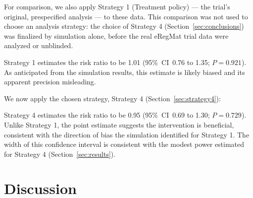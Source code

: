 \begin{minipage}{\linewidth}
\begin{stlog}
\nullskip
\end{stlog}
\end{minipage}

For comparison, we also apply Strategy 1 (Treatment policy) --- the
trial's original, prespecified analysis --- to these data. This
comparison was not used to choose an analysis strategy: the choice of
Strategy 4 (Section~\ref{sec:conclusions}) was finalized by simulation
alone, before the real eRegMat trial data were analyzed or unblinded.

\begin{minipage}{\linewidth}
\begin{stlog}
\nullskip
\end{stlog}
\end{minipage}

Strategy 1 estimates the risk ratio to be 1.01 (95\%~CI~0.76 to 1.35;
$P=0.921$). As anticipated from the simulation results, this estimate is
likely biased and its apparent precision misleading.

We now apply the chosen strategy, Strategy 4 (Section~\ref{sec:strategy4}):

\begin{minipage}{\linewidth}
\begin{stlog}
\nullskip
\end{stlog}
%
\vspace{1em}
\begin{stlog}
\nullskip
\end{stlog}
\end{minipage}

Strategy 4 estimates the risk ratio to be 0.95 (95\%~CI~0.69 to 1.30;
$P=0.729$). Unlike Strategy 1, the point estimate suggests the
intervention is beneficial, consistent with the direction of bias the
simulation identified for Strategy 1. The width of this confidence
interval is consistent with the modest power estimated for Strategy 4
(Section~\ref{sec:results}).


\section{Discussion}\label{sec:discussion}

